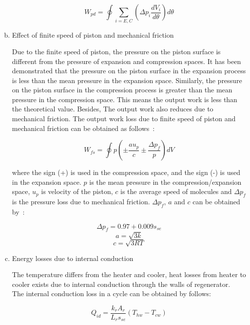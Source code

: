 \documentclass[review,3p,10t]{elsarticle}
\begin{document}
\begin{enumerate}[a.]
\begin{equation}
	W_{pd} = \oint\underset{i = E,C}{\sum}(\Delta p_{i}\frac{dV_i}{d\theta})d\theta
\end{equation}

\item Effect of finite speed of piston and mechanical friction

Due to the finite speed of piston, the pressure on the piston surface is different from the pressure of expansion and compression spaces. It has been demonstrated that the pressure on the piston surface in the expansion process is less than the mean pressure in the expansion space. Similarly, the pressure on the piston surface in the compression process is greater than the mean pressure in the compression space. This means the output work is less than the theoretical value. Besides, The output work also reduces due to mechanical friction. The output work loss due to finite speed of piston and mechanical friction can be obtained as follows~\cite{Babaelahi2015}:

\begin{equation}
	W_{fs} = \oint p(\pm\frac{au_p}{c}\pm\frac{\Delta p_f}{p})dV
\end{equation}

where the sign (+) is used in the compression space, and the sign (-) is used in the expansion space. $p$ is the mean pressure in the compression/expansion space, $u_p$ is velocity of the piston, $c$ is the average speed of molecules and $\Delta p_f$ is the pressure loss due to mechanical friction. $\Delta p_f$, $a$ and $c$ can be obtained by~\cite{Heywood1988}:

\begin{equation}
	\Delta p_f = 0.97+0.009s_{se}
\end{equation}
\begin{equation}
	a = \sqrt{3k}
\end{equation}
\begin{equation}
	c = \sqrt{3RT}
\end{equation}

\item Energy losses due to internal conduction

The temperature differs from the heater and cooler, heat losses from heater to cooler exists due to internal conduction through the walls of regenerator.~\cite{Strauss2010} The internal conduction loss in a cycle can be obtained by follows:

\begin{equation}
	Q_{id} = \frac{k_rA_r}{L_rs_{se}}(T_{hw} - T_{cw})
\end{equation}


\end{enumerate}
\end{document}
